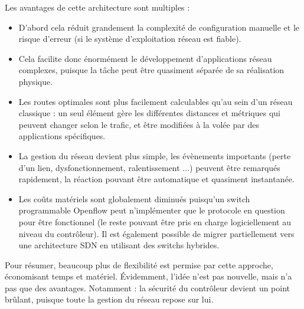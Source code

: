 Les avantages de cette architecture sont multiples :
\begin{itemize}
\item D'abord cela réduit grandement la complexité de configuration manuelle et le risque d'erreur (si le système d'exploitation réseau est fiable).
\item Cela facilite donc énormément le développement d'applications réseau complexes, puisque la tâche peut être quasiment séparée de sa réalisation physique.
\item Les routes optimales sont plus facilement calculables qu'au sein d'un réseau classique : un seul élément gère les différentes distances et métriques qui peuvent changer selon le trafic, et être modifiées à la volée par des applications spécifiques.
\item La gestion du réseau devient plus simple, les évènements importants (perte d'un lien, dysfonctionnement, ralentissement ...) peuvent être remarqués rapidement, la réaction pouvant être automatique et quasiment instantanée.
\item Les coûts matériels sont globalement diminués puisqu'un switch programmable Openflow peut n'implémenter que le protocole en question pour être fonctionnel (le reste pouvant être pris en charge logiciellement au niveau du contrôleur). Il est également possible de migrer partiellement vers une architecture SDN en utilisant des switchs hybrides.
\end{itemize}

Pour résumer, beaucoup plus de flexibilité est permise par cette approche, économisant temps et matériel. Évidemment, l'idée n'est pas nouvelle, mais n'a pas que des avantages. Notamment : la sécurité du contrôleur devient un point brûlant, puisque toute la gestion du réseau repose sur lui.